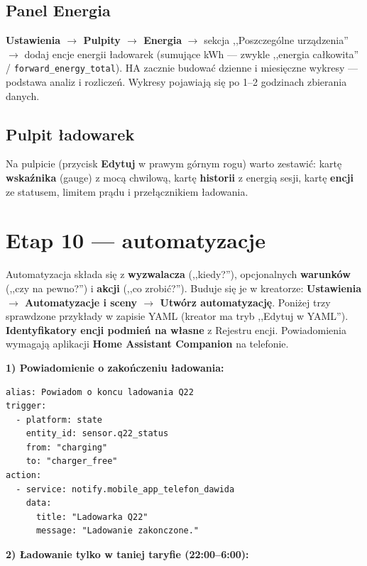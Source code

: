 \documentclass[11pt,a4paper]{article}
\begin{document}
\subsection{Panel Energia}

\textbf{Ustawienia $\to$ Pulpity $\to$ Energia} $\to$ sekcja ,,Poszczególne urządzenia'' $\to$ dodaj encje energii ładowarek (sumujące kWh --- zwykle ,,energia całkowita'' / \texttt{forward\_energy\_total}). HA zacznie budować dzienne i miesięczne wykresy --- podstawa analiz i rozliczeń. Wykresy pojawiają się po 1--2 godzinach zbierania danych.

\subsection{Pulpit ładowarek}

Na pulpicie (przycisk \textbf{Edytuj} w prawym górnym rogu) warto zestawić: kartę \textbf{wskaźnika} (gauge) z mocą chwilową, kartę \textbf{historii} z energią sesji, kartę \textbf{encji} ze statusem, limitem prądu i przełącznikiem ładowania.

\section{Etap 10 --- automatyzacje}
\label{sec:etap10}

Automatyzacja składa się z \textbf{wyzwalacza} (,,kiedy?''), opcjonalnych \textbf{warunków} (,,czy na pewno?'') i \textbf{akcji} (,,co zrobić?''). Buduje się je w kreatorze: \textbf{Ustawienia $\to$ Automatyzacje i sceny $\to$ Utwórz automatyzację}. Poniżej trzy sprawdzone przykłady w zapisie YAML (kreator ma tryb ,,Edytuj w YAML''). \textbf{Identyfikatory encji podmień na własne} z Rejestru encji. Powiadomienia wymagają aplikacji \textbf{Home Assistant Companion} na telefonie.

\textbf{1) Powiadomienie o zakończeniu ładowania:}

\begin{lstlisting}
alias: Powiadom o koncu ladowania Q22
trigger:
  - platform: state
    entity_id: sensor.q22_status
    from: "charging"
    to: "charger_free"
action:
  - service: notify.mobile_app_telefon_dawida
    data:
      title: "Ladowarka Q22"
      message: "Ladowanie zakonczone."
\end{lstlisting}

\textbf{2) Ładowanie tylko w taniej taryfie (22:00--6:00):}
\end{document}
